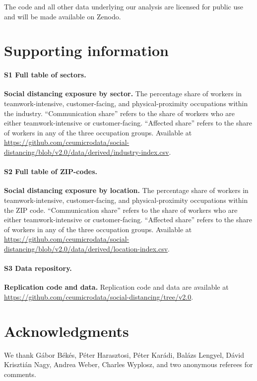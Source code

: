 \documentclass[10pt,letterpaper]{article}
\begin{document}
The code and all other data underlying our analysis are licensed for public use and will be made available on Zenodo. 

\section*{Supporting information}

\paragraph*{S1 Full table of sectors.}
\label{S1_File}
{\bf Social distancing exposure by sector.} The percentage share of workers in teamwork-intensive, customer-facing, and physical-proximity occupations within the industry. ``Communication share'' refers to the share of workers who are either teamwork-intensive or customer-facing. ``Affected share'' refers to the share of workers in any of the three occupation groups. Available at \url{https://github.com/ceumicrodata/social-distancing/blob/v2.0/data/derived/industry-index.csv}.

\paragraph*{S2 Full table of ZIP-codes.}
\label{S2_File}
{\bf Social distancing exposure by location.} The percentage share of workers in teamwork-intensive, customer-facing, and physical-proximity occupations within the ZIP code. ``Communication share'' refers to the share of workers who are either teamwork-intensive or customer-facing. ``Affected share'' refers to the share of workers in any of the three occupation groups. Available at \url{https://github.com/ceumicrodata/social-distancing/blob/v2.0/data/derived/location-index.csv}.

\paragraph*{S3 Data repository.}
\label{S3_URL}
{\bf Replication code and data.} Replication code and data are available at \url{https://github.com/ceumicrodata/social-distancing/tree/v2.0}.

\section*{Acknowledgments}
We thank Gábor Békés, Péter Harasztosi, Péter Karádi, Balázs Lengyel, Dávid Krisztián Nagy, Andrea Weber, Charles Wyplosz, and two anonymous referees for comments.

\nolinenumbers



 
\end{document}
